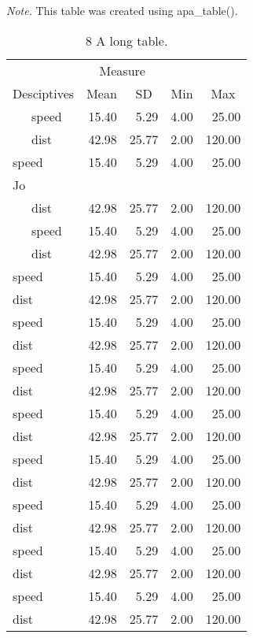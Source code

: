\documentclass[english,man]{apa6}
\makeatletter
\newcommand\LastLTentrywidth{1em}
\newlength\longtablewidth
\newcommand\getlongtablewidth{%
 \begingroup
  \ifcsname LT@\roman{LT@tables}\endcsname
  \global\longtablewidth=0pt
  \renewcommand\LT@entry[2]{\global\advance\longtablewidth by ##2\relax\gdef\LastLTentrywidth{##2}}%
  \@nameuse{LT@\roman{LT@tables}}%
  \fi
\endgroup}
\theoremstyle{definition}
\theoremstyle{definition}
\theoremstyle{definition}
\theoremstyle{remark}
\makeatother
\begin{document}
\begin{center}
\begin{ThreePartTable}
\begin{TableNotes}[para]
\textit{Note.} This table was created using apa\_table().
\end{TableNotes}
\begin{longtable}{lrrlr}\noalign{\getlongtablewidth\global\LTcapwidth=\longtablewidth}
\caption{\label{tab:unnamed-chunk-7}8 A long table.}\\
\toprule
 & \multicolumn{2}{c}{Measure}  &  &\\
\cmidrule(r){2-3}
Desciptives & \multicolumn{1}{c}{Mean} & \multicolumn{1}{c}{SD} & \multicolumn{1}{c}{Min} & \multicolumn{1}{c}{Max}\\
\midrule
\ \ \ speed & 15.40 & 5.29 & 4.00 & 25.00\\
\ \ \ dist & 42.98 & 25.77 & 2.00 & 120.00\\
speed & 15.40 & 5.29 & 4.00 & 25.00\\
Jo &  &  &  & \\ \midrule
\ \ \ dist & 42.98 & 25.77 & 2.00 & 120.00\\
\ \ \ speed & 15.40 & 5.29 & 4.00 & 25.00\\
\ \ \ dist & 42.98 & 25.77 & 2.00 & 120.00\\
speed & 15.40 & 5.29 & 4.00 & 25.00\\
dist & 42.98 & 25.77 & 2.00 & 120.00\\
speed & 15.40 & 5.29 & 4.00 & 25.00\\
dist & 42.98 & 25.77 & 2.00 & 120.00\\
speed & 15.40 & 5.29 & 4.00 & 25.00\\
dist & 42.98 & 25.77 & 2.00 & 120.00\\
speed & 15.40 & 5.29 & 4.00 & 25.00\\
dist & 42.98 & 25.77 & 2.00 & 120.00\\
speed & 15.40 & 5.29 & 4.00 & 25.00\\
dist & 42.98 & 25.77 & 2.00 & 120.00\\
speed & 15.40 & 5.29 & 4.00 & 25.00\\
dist & 42.98 & 25.77 & 2.00 & 120.00\\
speed & 15.40 & 5.29 & 4.00 & 25.00\\
dist & 42.98 & 25.77 & 2.00 & 120.00\\
speed & 15.40 & 5.29 & 4.00 & 25.00\\
dist & 42.98 & 25.77 & 2.00 & 120.00\\

\end{longtable}
\end{ThreePartTable}
\end{center}
\end{document}
